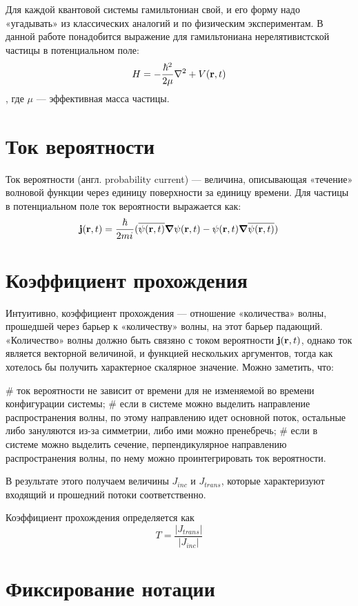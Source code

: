 Для каждой квантовой системы гамильтониан свой, и его форму надо «угадывать» из классических аналогий и по физическим экспериментам. В данной работе понадобится выражение для гамильтониана нерелятивистской частицы в потенциальном поле:
\[
H = - \frac{\hbar^2}{2 \mu} \laplacian + V(\vb{r}, t)
\],
где $\mu$ — эффективная масса частицы.

\section{Ток вероятности}
Ток вероятности (англ. probability current) — величина, описывающая «течение» волновой функции через единицу поверхности за единицу времени. Для частицы в потенциальном поле ток вероятности выражается как:
\[
\vb{j}(\vb{r}, t) = \frac{\hbar}{2 m {i\mkern1mu}} (\overline{\psi(\vb{r}, t)} \grad{\psi(\vb{r}, t)} - \psi(\vb{r}, t) \grad{\overline{\psi(\vb{r}, t)})}
\]

\section{Коэффициент прохождения}
Интуитивно, коэффициент прохождения — отношение «количества» волны, прошедшей через барьер к «количеству» волны, на этот барьер падающий. «Количество» волны должно быть связяно с током вероятности $\vb{j}(\vb{r}, t)$, однако ток является векторной величиной, и функцией нескольких аргументов, тогда как хотелось бы получить характерное скалярное значение. Можно заметить, что:

\begin{easylist}[itemize]
# ток вероятности не зависит от времени для не изменяемой во времени конфигурации системы;
# если в системе можно выделить направление распространения волны, по этому направлению идет основной поток, остальные либо зануляются из-за симметрии, либо ими можно пренебречь;
# если в системе можно выделить сечение, перпендикулярное направлению распространения волны, по нему можно проинтегрировать ток вероятности.
\end{easylist}

В результате этого получаем величины $J_{inc}$ и $J_{trans}$, которые характеризуют входящий и прошедний потоки соответственно. 

Коэффициент прохождения определяется как
\[
T = \frac{|J_{trans}|}{|J_{inc}|}
\]

\section{Фиксирование нотации}
